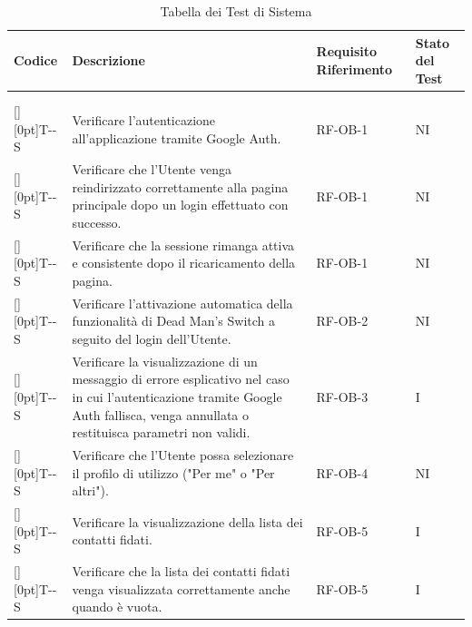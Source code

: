 \documentclass[a4paper,12pt]{article}
\newcounter{testsys}
\newcommand{\systestcode}{%
  \raisebox{0pt}[\height][0pt]{\hypertarget{T-\arabic{testsys}-S}{}}T-\arabic{testsys}-S%
}
\begin{document}
\begin{longtable}{| >{\centering\arraybackslash}p{} | >{\raggedright\arraybackslash}p{} | >{\centering\arraybackslash}p{} | >{\centering\arraybackslash}p{} |}
\hline
\rowcolor{gray!60}
\textbf{Codice} & \textbf{Descrizione} & \textbf{Requisito Riferimento} & \textbf{Stato del Test} \\
\hline
\endhead
\hline
\rowcolor{white}
\caption[]{Tabella dei Test di Sistema} \\
\endfoot
\hline
\caption{Tabella dei Test di Sistema} \\
\endlastfoot

\stepcounter{testsys} \systestcode & Verificare l'autenticazione all'applicazione tramite Google Auth. & RF-OB-1 & NI \\
\hline

\stepcounter{testsys} \systestcode & Verificare che l'Utente venga reindirizzato correttamente alla pagina principale dopo un login effettuato con successo. & RF-OB-1 & NI \\
\hline

\stepcounter{testsys} \systestcode & Verificare che la sessione rimanga attiva e consistente dopo il ricaricamento della pagina. & RF-OB-1 & NI \\
\hline

\stepcounter{testsys} \systestcode & Verificare l'attivazione automatica della funzionalità di Dead Man's Switch a seguito del login dell'Utente. & RF-OB-2 & NI \\
\hline

\stepcounter{testsys} \systestcode & Verificare la visualizzazione di un messaggio di errore esplicativo nel caso in cui l'autenticazione tramite Google Auth fallisca, venga annullata o restituisca parametri non validi. & RF-OB-3 & I \\
\hline

\stepcounter{testsys} \systestcode & Verificare che l'Utente possa selezionare il profilo di utilizzo ("Per me" o "Per altri"). & RF-OB-4 & NI \\
\hline

\stepcounter{testsys} \systestcode & Verificare la visualizzazione della lista dei contatti fidati. & RF-OB-5 & I \\
\hline

\stepcounter{testsys} \systestcode & Verificare che la lista dei contatti fidati venga visualizzata correttamente anche quando è vuota. & RF-OB-5 & I \\
\hline


\end{longtable}
\end{document}

